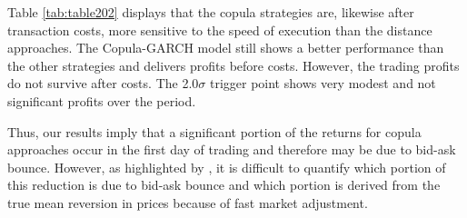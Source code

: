 \documentclass[a4paper,12pt]{report}
\begin{document}
\begin{refsection}
Table \ref{tab:table202} displays that the copula strategies are, likewise after transaction costs, more sensitive to the speed of execution than the distance approaches. The Copula-GARCH model still shows a better performance than the other strategies and delivers profits before costs. However, the trading profits do not survive after costs. The 2.0$\sigma$ trigger point shows very modest and not significant profits over the period.

Thus, our results imply that a significant portion of the returns for copula approaches occur in the first day of trading and therefore may be due to bid-ask bounce. However, as highlighted by \citet*{ggr06}, it is difficult to quantify which portion of this reduction is due to bid-ask bounce and which portion is derived from the true mean reversion in prices because of fast market adjustment.

\medskip


\end{refsection}
\end{document}
